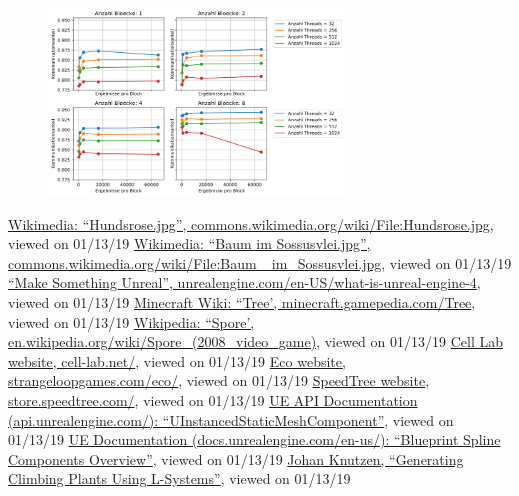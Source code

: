 \documentclass[11pt, abstract=on]{scrartcl}
\begin{document}
\begin{figure} [htbp]
 	\centering
 		\includegraphics[width=0.7\textwidth]{Graph_KommunikationAnteil.png}
 	\caption{}
\end{figure}

\begin{thebibliography}{99}
	  \href{https://commons.wikimedia.org/wiki/File:Hundsrose.jpg}{Wikimedia: ``Hundsrose.jpg'', commons.wikimedia.org/wiki/File:Hundsrose.jpg}, viewed on 01/13/19
	 \href{https://commons.wikimedia.org/wiki/File:Baum_im_Sossusvlei.jpg}
	{Wikimedia: ``Baum im Sossusvlei.jpg'', commons.wikimedia.org/wiki/File:Baum\_ im\_Sossusvlei.jpg}, viewed on 01/13/19
	  \href{https://www.unrealengine.com/en-US/what-is-unreal-engine-4}{``Make Something Unreal'', unrealengine.com/en-US/what-is-unreal-engine-4}, viewed on 01/13/19
	  \href{https://minecraft.gamepedia.com/Tree}{Minecraft Wiki: ``Tree', minecraft.gamepedia.com/Tree}, viewed on 01/13/19
	  \href{https://en.wikipedia.org/wiki/Spore_(2008_video_game)}{Wikipedia: ``Spore', en.wikipedia.org/wiki/Spore\_(2008\_video\_game)}, viewed on 01/13/19
	  \href{http://cell-lab.net/}{Cell Lab website, cell-lab.net/}, viewed on 01/13/19
	  \href{https://www.strangeloopgames.com/eco/}{Eco website, strangeloopgames.com/eco/}, viewed on 01/13/19
	  \href{https://store.speedtree.com/}{SpeedTree website, store.speedtree.com/}, viewed on 01/13/19
	  \href{https://api.unrealengine.com/INT/API/Runtime/Engine/Components/UInstancedStaticMeshComponent/index.html}{UE API Documentation (api.unrealengine.com/): ``UInstancedStaticMeshComponent''}, viewed on 01/13/19
	  \href{https://docs.unrealengine.com/en-us/Engine/BlueprintSplines/Overview}{UE Documentation (docs.unrealengine.com/en-us/): ``Blueprint Spline Components Overview''}, viewed on 01/13/19
	  \href{http://www.cse.chalmers.se/~uffe/xjobb/climbingplants.pdf}{Johan Knutzen, ``Generating Climbing Plants Using L-Systems''}, viewed on 01/13/19
	
\end{thebibliography}
\end{document}
